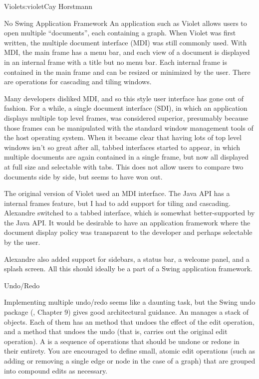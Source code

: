 \begin{aosachapter}{Violet}{s:violet}{Cay Horstmann}
\begin{aosasect1}{No Swing Application Framework}
An application such as Violet allows users to open multiple
``documents'', each containing a graph. When Violet was first written,
the multiple document interface (MDI) was still commonly used.  With
MDI, the main frame has a menu bar, and each view of a document is
displayed in an internal frame with a title but no menu bar. Each
internal frame is contained in the main frame and can be resized or
minimized by the user. There are operations for cascading and tiling
windows.

Many developers disliked MDI, and so this style user interface has 
gone out of fashion. For a while, a single document interface (SDI), in which an
application displays multiple top level frames, was considered
superior, presumably because those frames can be manipulated with the
standard window management tools of the host operating system. When it
became clear that having lots of top level windows isn't so great
after all, tabbed interfaces started to appear, in which multiple
documents are again contained in a single frame, but now all displayed
at full size and selectable with tabs. This does not allow users
to compare two documents side by side, but seems to have won out.

The original version of Violet used an MDI interface. The Java API has
a internal frames feature, but I had to add support for tiling and
cascading.  Alexandre switched to a tabbed interface, which is
somewhat better-supported by the Java API\@. It would be desirable to
have an application framework where the document display policy was
transparent to the developer and perhaps selectable by the user.

Alexandre also added support for sidebars, a status bar, a welcome
panel, and a splash screen. All this should ideally be a part of a
Swing application framework.

\end{aosasect1}

\begin{aosasect1}{Undo/Redo}

Implementing multiple undo/redo seems like a daunting task, but the
Swing undo package (\cite{bib:topley:coreswing}, Chapter 9) gives good
architectural guidance. An  manages a stack of
 objects. Each of them has an  method
that undoes the effect of the edit operation, and a  method
that undoes the undo (that is, carries out the original edit
operation). A  is a sequence of 
operations that should be undone or redone in their entirety. You are
encouraged to define small, atomic edit operations (such as adding or
removing a single edge or node in the case of a graph) that are
grouped into compound edits as necessary.


\end{aosasect1}
\end{aosachapter}
